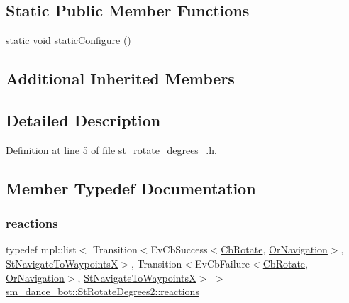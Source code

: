 \subsection*{Static Public Member Functions}
\begin{DoxyCompactItemize}
\item 
static void \hyperlink{structsm__dance__bot_1_1StRotateDegrees2_ac6566aa987d37915d13b974a8fe8df42}{static\+Configure} ()
\end{DoxyCompactItemize}
\subsection*{Additional Inherited Members}


\subsection{Detailed Description}


Definition at line 5 of file st\+\_\+rotate\+\_\+degrees\+\_.\+h.



\subsection{Member Typedef Documentation}
\mbox{\label{structsm__dance__bot_1_1StRotateDegrees2_a7619f7987ad4ff6a50fbf6e6c79adcbd}} 
\subsubsection{\texorpdfstring{reactions}{reactions}}
{\footnotesize\ttfamily typedef mpl\+::list$<$ Transition$<$Ev\+Cb\+Success$<$\hyperlink{classcl__move__base__z_1_1CbRotate}{Cb\+Rotate}, \hyperlink{classsm__dance__bot_1_1OrNavigation}{Or\+Navigation}$>$, \hyperlink{structsm__dance__bot_1_1StNavigateToWaypointsX}{St\+Navigate\+To\+WaypointsX}$>$, Transition$<$Ev\+Cb\+Failure$<$\hyperlink{classcl__move__base__z_1_1CbRotate}{Cb\+Rotate}, \hyperlink{classsm__dance__bot_1_1OrNavigation}{Or\+Navigation}$>$, \hyperlink{structsm__dance__bot_1_1StNavigateToWaypointsX}{St\+Navigate\+To\+WaypointsX}$>$ $>$ \hyperlink{structsm__dance__bot_1_1StRotateDegrees2_a7619f7987ad4ff6a50fbf6e6c79adcbd}{sm\+\_\+dance\+\_\+bot\+::\+St\+Rotate\+Degrees2\+::reactions}}



